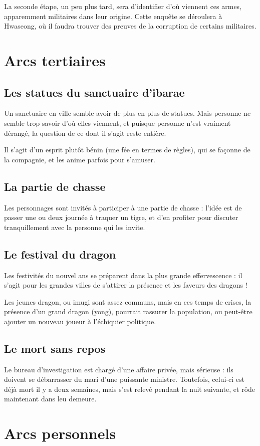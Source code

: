 \documentclass[10pt,a4paper]{book}
\begin{document}
La seconde étape, un peu plus tard, sera d'identifier d'où viennent ces armes, apparemment militaires dans leur origine. Cette enquête se déroulera à Hwaseong, où il faudra trouver des preuves de la corruption de certains militaires. 
\section{Arcs tertiaires}
\subsection{Les statues du sanctuaire d'ibarae}
Un sanctuaire en ville semble avoir de plus en plus de statues. Mais personne ne semble trop savoir d'où elles viennent, et puisque personne n'est vraiment dérangé, la question de ce dont il s'agit reste entière.

Il s'agit d'un esprit plutôt bénin (une fée en termes de règles), qui se façonne de la compagnie, et les anime parfois pour s'amuser. 
\subsection{La partie de chasse}
Les personnages sont invités à participer à une partie de chasse : l'idée est de passer une ou deux journée à traquer un tigre, et d'en profiter pour discuter tranquillement avec la personne qui les invite.

\subsection{Le festival du dragon}
Les festivités du nouvel ans se préparent dans la plus grande effervescence : il s'agit pour les grandes villes de s'attirer la présence et les faveurs des dragons !

Les jeunes dragon, ou imugi sont assez communs, mais en ces temps de crises, la présence d'un grand dragon (yong), pourrait rassurer la population, ou peut-être ajouter un nouveau joueur à l'échiquier politique.
\subsection{Le mort sans repos}
Le bureau d'investigation est chargé d'une affaire privée, mais sérieuse : ils doivent se débarrasser du mari d'une puissante ministre. Toutefois, celui-ci est déjà mort il y a deux semaines, mais s'est relevé pendant la nuit suivante, et rôde maintenant dans leu demeure.

\section{Arcs personnels}
\end{document}
